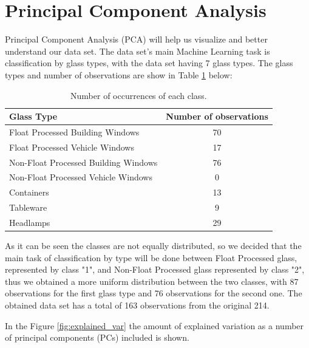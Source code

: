 \documentclass[12pt]{article}
\begin{document}
\section{Principal Component Analysis} \label{PCA}

Principal Component Analysis (PCA) will help us visualize and better understand our data set. The data set's main Machine Learning task is classification by glass types, with the data set having 7 glass types. The glass types and number of observations are show in Table \ref{table:4} below:

\begin{table}[H]
\begin{tabular}{|l|c|}
\hline
Glass Type                           & Number of observations \\ \hline
Float Processed Building Windows     & 70                     \\ \hline
Float Processed Vehicle Windows      & 17                     \\ \hline
Non-Float Processed Building Windows & 76                     \\ \hline
Non-Float Processed Vehicle Windows  & 0                      \\ \hline
Containers                           & 13                     \\ \hline
Tableware                            & 9                      \\ \hline
Headlamps                            & 29                     \\ \hline
\end{tabular}
\caption{Number of occurrences of each class.}
\label{table:4}
\end{table}

As it can be seen the classes are not equally distributed, so we decided that the main task of classification by type will be done between Float Processed glass, represented by class "1", and Non-Float Processed glass represented by class "2", thus we obtained a more uniform distribution between the two classes, with 87 observations for the first glass type and 76 observations for the second one. The obtained data set has a total of 163 observations from the original 214.

In the Figure \ref{fig:explained_var} the amount of explained variation as a number of principal components (PCs) included is shown. 
\end{document}

